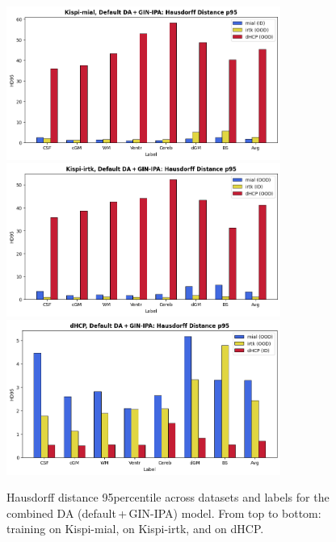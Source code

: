 \begin{figure}[htbp]
    \centering
    \includegraphics[width=0.8\textwidth]{figures/mial_both_HD.png}\\
    \vspace{2pt}
    \includegraphics[width=0.8\textwidth]{figures/irtk_both_HD.png}\\
    \vspace{2pt}
    \includegraphics[width=0.8\textwidth]{figures/dHCP_both_HD.png}
    \caption{Hausdorff distance 95\th percentile across datasets and labels for the combined DA (default\,+\,GIN-IPA) model. From top to bottom: training on Kispi-mial, on Kispi-irtk, and on dHCP.}
    \label{fig:both_HD}
\end{figure}
